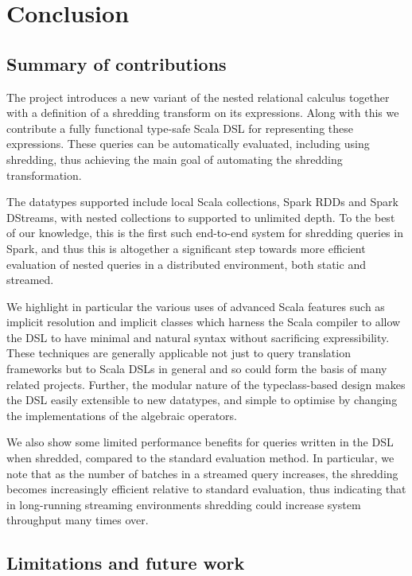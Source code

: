 \chapter{Conclusion} \label{conclusion}

\section{Summary of contributions}

The project introduces a new variant of the nested relational calculus together with a definition of a shredding transform on its expressions. Along with this we contribute a fully functional type-safe Scala DSL for representing these expressions. These queries can be automatically evaluated, including using shredding, thus achieving the main goal of automating the shredding transformation.

The datatypes supported include local Scala collections, Spark RDDs and Spark DStreams, with nested collections to supported to unlimited depth. To the best of our knowledge, this is the first such end-to-end system for shredding queries in Spark, and thus this is altogether a significant step towards more efficient evaluation of nested queries in a distributed environment, both static and streamed.

We highlight in particular the various uses of advanced Scala features such as implicit resolution and implicit classes which harness the Scala compiler to allow the DSL to have minimal and natural syntax without sacrificing expressibility. These techniques are generally applicable not just to query translation frameworks but to Scala DSLs in general and so could form the basis of many related projects. Further, the modular nature of the typeclass-based design makes the DSL easily extensible to new datatypes, and simple to optimise by changing the implementations of the algebraic operators.

We also show some limited performance benefits for queries written in the DSL when shredded, compared to the standard evaluation method. In particular, we note that as the number of batches in a streamed query increases, the shredding becomes increasingly efficient relative to standard evaluation, thus indicating that in long-running streaming environments shredding could increase system throughput many times over.

\section{Limitations and future work} \label{limitations}


